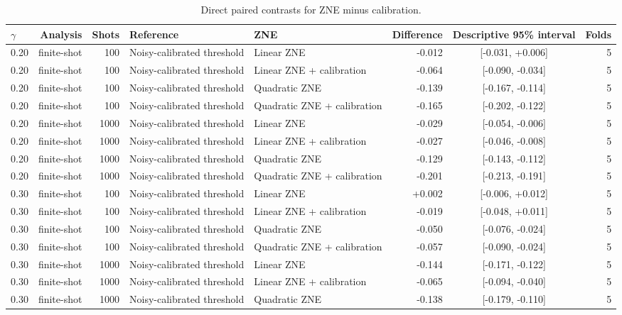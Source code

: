 \documentclass[10pt]{article}
\begin{document}
\begin{table}[t]
\centering
\caption{Direct paired contrasts for ZNE minus calibration.}
\label{tab:paired}
\scriptsize
\begin{tabular}{@{}l r r l l r c r@{}}
\toprule
$\gamma$ & Analysis & Shots & Reference & ZNE & Difference & Descriptive 95\% interval & Folds \\
\midrule
0.20 & finite-shot & 100 & Noisy-calibrated threshold & Linear ZNE & -0.012 & [-0.031, +0.006] & 5 \\
0.20 & finite-shot & 100 & Noisy-calibrated threshold & Linear ZNE + calibration & -0.064 & [-0.090, -0.034] & 5 \\
0.20 & finite-shot & 100 & Noisy-calibrated threshold & Quadratic ZNE & -0.139 & [-0.167, -0.114] & 5 \\
0.20 & finite-shot & 100 & Noisy-calibrated threshold & Quadratic ZNE + calibration & -0.165 & [-0.202, -0.122] & 5 \\
0.20 & finite-shot & 1000 & Noisy-calibrated threshold & Linear ZNE & -0.029 & [-0.054, -0.006] & 5 \\
0.20 & finite-shot & 1000 & Noisy-calibrated threshold & Linear ZNE + calibration & -0.027 & [-0.046, -0.008] & 5 \\
0.20 & finite-shot & 1000 & Noisy-calibrated threshold & Quadratic ZNE & -0.129 & [-0.143, -0.112] & 5 \\
0.20 & finite-shot & 1000 & Noisy-calibrated threshold & Quadratic ZNE + calibration & -0.201 & [-0.213, -0.191] & 5 \\
0.30 & finite-shot & 100 & Noisy-calibrated threshold & Linear ZNE & +0.002 & [-0.006, +0.012] & 5 \\
0.30 & finite-shot & 100 & Noisy-calibrated threshold & Linear ZNE + calibration & -0.019 & [-0.048, +0.011] & 5 \\
0.30 & finite-shot & 100 & Noisy-calibrated threshold & Quadratic ZNE & -0.050 & [-0.076, -0.024] & 5 \\
0.30 & finite-shot & 100 & Noisy-calibrated threshold & Quadratic ZNE + calibration & -0.057 & [-0.090, -0.024] & 5 \\
0.30 & finite-shot & 1000 & Noisy-calibrated threshold & Linear ZNE & -0.144 & [-0.171, -0.122] & 5 \\
0.30 & finite-shot & 1000 & Noisy-calibrated threshold & Linear ZNE + calibration & -0.065 & [-0.094, -0.040] & 5 \\
0.30 & finite-shot & 1000 & Noisy-calibrated threshold & Quadratic ZNE & -0.138 & [-0.179, -0.110] & 5 \\

\end{tabular}
\end{table}
\end{document}
